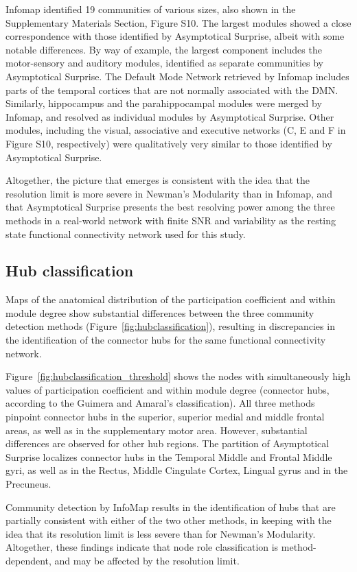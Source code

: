 Infomap identified 19 communities of various sizes, also shown in the Supplementary Materials Section, Figure S10.
The largest modules showed a close correspondence with those identified by Asymptotical Surprise, albeit with some notable differences.
By way of example, the largest component includes the motor-sensory and auditory modules, identified as separate communities by Asymptotical Surprise.
The Default Mode Network retrieved by Infomap includes parts of the temporal cortices that are not normally associated with the DMN.
Similarly, hippocampus and the parahippocampal modules were merged by Infomap, and resolved as individual modules  by Asymptotical Surprise.
Other modules, including the visual, associative and executive networks (C, E and F in Figure S10, respectively) were qualitatively very similar to those identified by Asymptotical Surprise.

Altogether, the picture that emerges is consistent with the idea that the resolution limit is more severe in Newman's Modularity than in Infomap, and that Asymptotical Surprise presents the best resolving power among the three methods in a real-world network with finite SNR and variability as the resting state functional connectivity network used for this study.

\subsection{Hub classification}
Maps of the anatomical distribution of the participation coefficient and within module degree show substantial differences between the three community detection methods (Figure~\ref{fig:hubclassification}), resulting in discrepancies in the identification of the connector hubs for the same functional connectivity network.

Figure~\ref{fig:hubclassification_threshold} shows the nodes with simultaneously high values of participation coefficient and within module degree (connector hubs, according to the Guimera and Amaral's classification).
All three methods pinpoint connector hubs in the superior, superior medial and middle frontal areas, as well as in the supplementary motor area.
However, substantial differences are observed for other hub regions. The partition of Asymptotical Surprise localizes connector hubs in the Temporal Middle and Frontal Middle gyri, as well as in the Rectus, Middle Cingulate Cortex, Lingual gyrus and in the Precuneus.

Community detection by InfoMap results in the identification of hubs that are partially consistent with either of the two other methods, in keeping with the idea that its resolution limit is less severe than for Newman's Modularity.
Altogether, these findings indicate that node role classification is method-dependent, and may be affected by the resolution limit.


